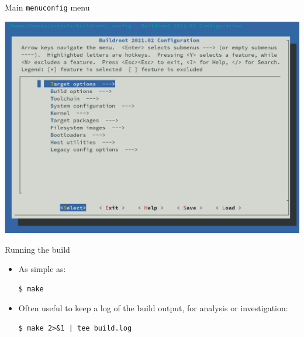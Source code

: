 \begin{frame}{Main {\tt menuconfig} menu}
  \begin{center}
    \includegraphics[height=0.8\textheight]{slides/buildroot-introduction/menuconfig.png}
  \end{center}
\end{frame}

\begin{frame}[fragile]{Running the build}
  \begin{itemize}
  \item As simple as:
    \begin{block}{}
\begin{verbatim}
$ make
\end{verbatim}
    \end{block}
  \item Often useful to keep a log of the build output, for analysis
    or investigation:
    \begin{block}{}
\begin{verbatim}
$ make 2>&1 | tee build.log
\end{verbatim}
    \end{block}
  \end{itemize}
\end{frame}

